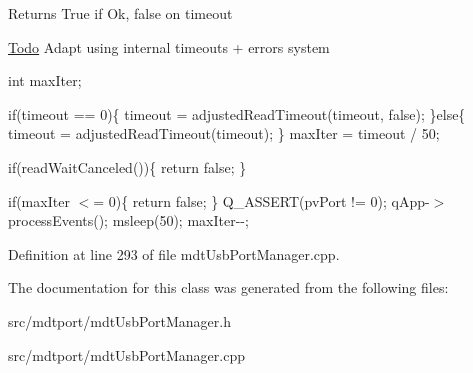\begin{DoxyReturn}{Returns}
True if Ok, false on timeout
\end{DoxyReturn}
\begin{Desc}
\item[\hyperlink{todo__todo000058}{Todo}]Adapt using internal timeouts + errors system \end{Desc}


int maxIter;

if(timeout == 0)\{ timeout = adjustedReadTimeout(timeout, false); \}else\{ timeout = adjustedReadTimeout(timeout); \} maxIter = timeout / 50;

if(readWaitCanceled())\{ return false; \}

if(maxIter $<$= 0)\{ return false; \} Q\_\-ASSERT(pvPort != 0); qApp-\/$>$processEvents(); msleep(50); maxIter-\/-\/;



Definition at line 293 of file mdtUsbPortManager.cpp.



The documentation for this class was generated from the following files:\begin{DoxyCompactItemize}
\item 
src/mdtport/mdtUsbPortManager.h\item 
src/mdtport/mdtUsbPortManager.cpp\end{DoxyCompactItemize}
